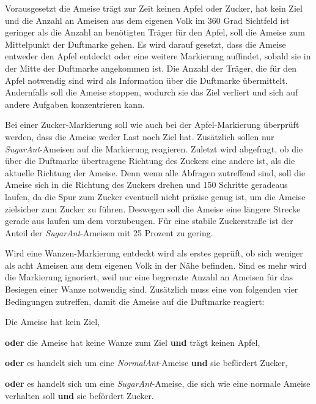 
Vorausgesetzt die Ameise trägt zur Zeit keinen Apfel oder Zucker, hat kein Ziel und die Anzahl an Ameisen aus dem eigenen Volk im 360 Grad Sichtfeld ist geringer als die Anzahl an benötigten Träger für den Apfel, soll die Ameise zum Mittelpunkt der Duftmarke gehen. Es wird darauf gesetzt, dass die Ameise entweder den Apfel entdeckt oder eine weitere Markierung auffindet, sobald sie in der Mitte der Duftmarke angekommen ist. Die Anzahl der Träger, die für den Apfel notwendig sind wird als Information über die Duftmarke übermittelt. Andernfalls soll die Ameise stoppen, wodurch sie das Ziel verliert und sich auf andere Aufgaben konzentrieren kann.


Bei einer Zucker-Markierung soll wie auch bei der Apfel-Markierung überprüft werden, dass die Ameise weder Last noch Ziel hat. Zusätzlich sollen nur \textit{SugarAnt}-Ameisen auf die Markierung reagieren. Zuletzt wird abgefragt, ob die über die Duftmarke übertragene Richtung des Zuckers eine andere ist, als die aktuelle Richtung der Ameise. Denn wenn alle Abfragen zutreffend sind, soll die Ameise sich in die Richtung des Zuckers drehen und 150 Schritte geradeaus laufen, da die Spur zum Zucker eventuell nicht präzise genug ist, um die Ameise zielsicher zum Zucker zu führen. Deswegen soll die Ameise eine längere Strecke gerade aus laufen um dem vorzubeugen. Für eine stabile Zuckerstraße ist der Anteil der \textit{SugarAnt}-Ameisen mit 25 Prozent zu gering.


Wird eine Wanzen-Markierung entdeckt wird als erstes geprüft, ob sich weniger als acht Ameisen aus dem eigenen Volk in der Nähe befinden. Sind es mehr wird die Markierung ignoriert, weil nur eine begrenzte Anzahl an Ameisen für das Besiegen einer Wanze notwendig sind. Zusätzlich muss eine von folgenden vier Bedingungen zutreffen, damit die Ameise auf die Duftmarke reagiert:
\begin{compactitem}
   \item Die Ameise hat kein Ziel,
   \item \textbf{oder} die Ameise hat keine Wanze zum Ziel \textbf{und} trägt keinen Apfel,
   \item \textbf{oder} es handelt sich um eine \textit{NormalAnt}-Ameise \textbf{und} sie befördert Zucker,
   \item \textbf{oder} es handelt sich um eine \textit{SugarAnt}-Ameise, die sich wie eine normale Ameise  verhalten soll \textbf{und} sie befördert Zucker.
\end{compactitem}

